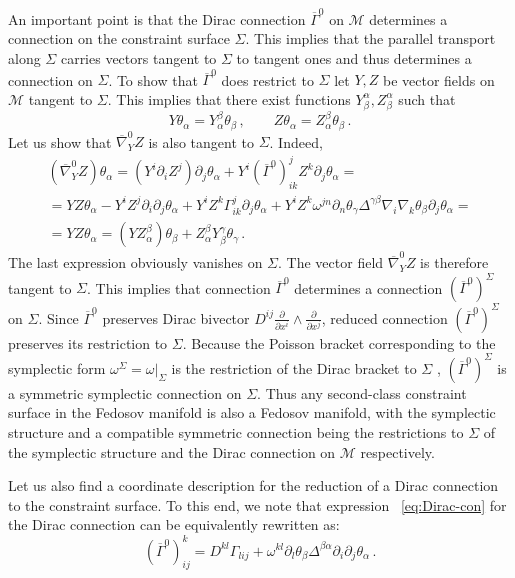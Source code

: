 \documentclass[a4paper,11pt]{amsart}
\numberwithin{thm}{section} %
\numberwithin{equation}{section} %
\numberwithin{figure}{section} %
\renewcommand{\:}{{\rm\, :\,}}
\def\bar{\overline}
\def\d{\partial}
\newcommand{\sdl}[1]{\frac{{\d}}{\d #1}}
\def\manM{{\mathcal M}}
\def\con{{\bar\Gamma}}
\def\Dcon-d{{\bar\nabla}^0}
\begin{document}
An important point is that the Dirac connection $\con^0$ on $\manM$
determines a connection on the constraint surface $\Sigma$.
This implies that the parallel transport along $\Sigma$ carries
vectors tangent to $\Sigma$ to tangent ones and thus determines a
connection on
$\Sigma$. 
To show that $\con^0$ does restrict to $\Sigma$ let $Y,Z$ be vector
fields on $\manM$ tangent to $\Sigma$.  This implies that
there exist functions $Y^\alpha_\beta,Z^\alpha_\beta$ such that
\begin{equation}
  Y\theta_\alpha=Y^\beta_\alpha\theta_\beta\,, \qquad
  Z\theta_\alpha=Z^\beta_\alpha\theta_\beta\,.
\end{equation}
Let us show that $\Dcon-d_Y Z$ is also
tangent to $\Sigma$. Indeed,
\begin{multline}
    (\Dcon-d_Y Z)\theta_\alpha=
    (Y^i\d_iZ^j)\d_j \theta_\alpha+Y^i(\con^0)^j_{ik}Z^k\d_j\theta_\alpha=\\
=    YZ\theta_\alpha-Y^iZ^j\d_i\d_j \theta_\alpha
+Y^iZ^k \Gamma^j_{ik} \d_j \theta_\alpha
+Y^iZ^k  \omega^{jn} \d_n \theta_\gamma \Delta^{\gamma\beta}
\nabla_i\nabla_k\theta_\beta \d_j \theta_\alpha=\\
=YZ\theta_\alpha=(YZ^\beta_\alpha)\theta_\beta+Z^\beta_\alpha
Y^\gamma_\beta \theta_\gamma\,.
\end{multline}
The last expression obviously vanishes on $\Sigma$. The vector field
$\Dcon-d_Y Z$ is therefore tangent to $\Sigma$.  This implies that
connection $\con^0$ determines a connection $(\con^0)^\Sigma$ on
$\Sigma$.  Since $\con^0$ preserves Dirac bivector $D^{ij}\sdl{x^i}
\wedge \sdl{x^j}$, reduced connection $(\con^0)^\Sigma$ preserves its
restriction to $\Sigma$.  Because the Poisson bracket corresponding to the
symplectic form $\omega^\Sigma=\omega\bigr|_{\Sigma}$ is the restriction
of the Dirac bracket to $\Sigma$ , $(\con^0)^\Sigma$ is a symmetric
symplectic connection on $\Sigma$.  Thus any second-class constraint
surface in the Fedosov manifold is also a Fedosov manifold, with the
symplectic structure and a compatible symmetric connection being
the restrictions to $\Sigma$ of the symplectic structure and
the Dirac connection on $\manM$ respectively.

Let us also find a coordinate description for the reduction
of a Dirac connection to the constraint surface.
To this end, we note that expression ~\eqref{eq:Dirac-con} for the
Dirac connection can be equivalently rewritten as:
\begin{equation}
{(\con^0)}^k_{ij}=D^{kl}\Gamma_{lij}+
\omega^{kl}\d_l \theta_\beta \Delta^{\beta\alpha} \d_i \d_j \theta_\alpha \,.
\end{equation}
\end{document}
